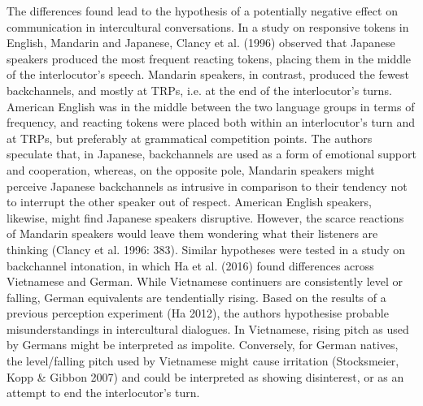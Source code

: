 \begin{styleStandard}
The differences found lead to the hypothesis of a potentially negative effect on communication in intercultural conversations. In a study on responsive tokens in English, Mandarin and Japanese, Clancy et al. (1996) observed that Japanese speakers produced the most frequent reacting tokens, placing them in the middle of the interlocutor’s speech. Mandarin speakers, in contrast, produced the fewest backchannels, and mostly at TRPs, i.e. at the end of the interlocutor’s turns. American English was in the middle between the two language groups in terms of frequency, and reacting tokens were placed both within an interlocutor’s turn and at TRPs, but preferably at grammatical competition points. The authors speculate that, in Japanese, backchannels are used as a form of emotional support and cooperation, whereas, on the opposite pole, Mandarin speakers might perceive Japanese backchannels as intrusive in comparison to their tendency not to interrupt the other speaker out of respect. American English speakers, likewise, might find Japanese speakers disruptive. However, the scarce reactions of Mandarin speakers would leave them wondering what their listeners are thinking (Clancy et al. 1996: 383). Similar hypotheses were tested in a study on backchannel intonation, in which Ha et al. (2016) found differences across Vietnamese and German. While Vietnamese continuers are consistently level or falling, German equivalents are tendentially rising. Based on the results of a previous perception experiment (Ha 2012), the authors hypothesise probable misunderstandings in intercultural dialogues. In Vietnamese, rising pitch as used by Germans might be interpreted as impolite. Conversely, for German natives, the level/falling pitch used by Vietnamese might cause irritation (Stocksmeier, Kopp \& Gibbon 2007) and could be interpreted as showing disinterest, or as an attempt to end the interlocutor’s turn.
\end{styleStandard}

